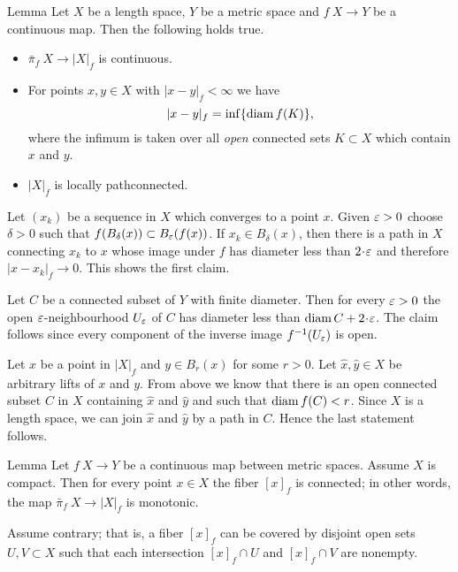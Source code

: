\documentclass{article}
\begin{document}
\begin{thm}{Lemma}\label{lem:picont}
Let $X$ be a length space, $Y$ be a metric space and $f\:X\to Y$ be a continuous map. 
Then the following holds true.
\begin{itemize}
\item $\bar\pi_f\:X\to|X|_f$ is continuous.

 \item For points $x,y\in X$ with $|x-y|_f<\infty$ we have
\[|x-y|_f=\inf\{\mathop{\rm diam}\nolimits f(K)\},\]
where the infimum is taken over all {\em open} connected sets $K\subset X$ which contain $x$ and $y$.

\item $|X|_f$ is locally pathconnected.
\end{itemize}

\end{thm}

Let $(x_k)$ be a sequence in $X$ which converges to a point $x$. 
Given $\varepsilon>0$ choose $\delta>0$ such that $f(B_\delta(x))\subset B_\varepsilon(f(x))$. 
If $x_k\in B_\delta(x)$, then there is a path in $X$ connecting $x_k$ to $x$ whose image under $f$ has diameter less than $2\cdot\eps$ and therefore $|x-x_k|_f\to 0$. 
This shows the first claim.

Let $C$ be a connected subset of $Y$ with finite diameter. 
Then for every $\varepsilon>0$ the open $\varepsilon$-neighbourhood $U_\varepsilon$ of $C$ has diameter less than $\diam C+2\cdot\eps$. 
The claim follows since every component of the inverse image $f^{-1}(U_\varepsilon)$ is open. 

Let $x$ be a point in $|X|_f$ and $y\in B_r(x)$ for some $r>0$. 
Let $\hat x,\hat y\in X$ be arbitrary lifts of $x$ and $y$.
From above we know that there is an open connected subset $C$ in $X$ containing $\hat x$ and $\hat y$ and such that 
$\mathop{\rm diam}\nolimits f(C)<r$. 
Since $X$ is a length space, we can join $\hat x$ and $\hat y$ by a path in $C$.
Hence the last statement follows.
\qeds

\begin{thm}{Lemma}\label{cor:fiberconnected}
Let $f\:X\to Y$ be a continuous map between metric spaces.
Assume $X$ is compact. 
Then for every point $x\in X$ the fiber $[x]_f$ is connected;
in other words, the map $\bar\pi_f\:X\to |X|_f$ is monotonic.
\end{thm}


Assume contrary;
that is, a fiber $[x]_f$ can be covered by disjoint open sets $U,V\subset X$ such that each intersection 
$[x]_f\cap U$ and $[x]_f\cap V$ are nonempty.
\end{document}
